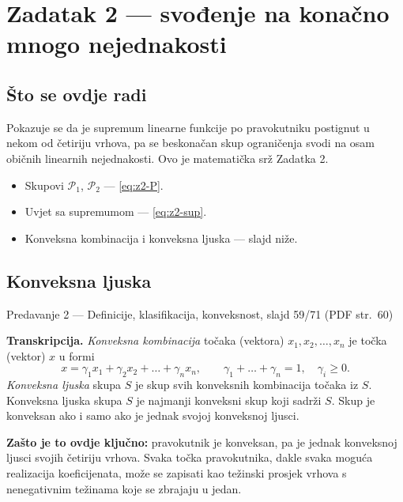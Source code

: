 \chapter{Zadatak 2 --- svođenje na konačno mnogo nejednakosti}
\label{ch:z2-vrhovi}

\section{Što se ovdje radi}

Pokazuje se da je supremum linearne funkcije po pravokutniku postignut u nekom
od četiriju vrhova, pa se beskonačan skup ograničenja svodi na osam običnih
linearnih nejednakosti. Ovo je matematička srž Zadatka 2.

\begin{predznanje}
\begin{itemize}[nosep,leftmargin=*]
  \item Skupovi $\mathcal{P}_1$, $\mathcal{P}_2$ --- \eqref{eq:z2-P}.
  \item Uvjet sa supremumom --- \eqref{eq:z2-sup}.
  \item Konveksna kombinacija i konveksna ljuska --- slajd niže.
\end{itemize}
\end{predznanje}

\section{Konveksna ljuska}
\label{sec:z2-ljuska}

\begin{izvor}{Predavanje 2 --- Definicije, klasifikacija, konveksnost, slajd 59/71 (PDF str.~60)}

\textbf{Transkripcija.} \emph{Konveksna kombinacija} točaka (vektora)
$x_1, x_2, \dots, x_n$ je točka (vektor) $x$ u formi
\[
x = \gamma_1 x_1 + \gamma_2 x_2 + \dots + \gamma_n x_n,
\qquad \gamma_1 + \dots + \gamma_n = 1, \quad \gamma_i \geq 0 .
\]
\emph{Konveksna ljuska} skupa $S$ je skup svih konveksnih kombinacija točaka iz
$S$. Konveksna ljuska skupa $S$ je najmanji konveksni skup koji sadrži $S$. Skup
je konveksan ako i samo ako je jednak svojoj konveksnoj ljusci.

\textbf{Zašto je to ovdje ključno:} pravokutnik je konveksan, pa je jednak
konveksnoj ljusci svojih četiriju vrhova. Svaka točka pravokutnika, dakle svaka
moguća realizacija koeficijenata, može se zapisati kao težinski prosjek vrhova s
nenegativnim težinama koje se zbrajaju u jedan.
\end{izvor}

